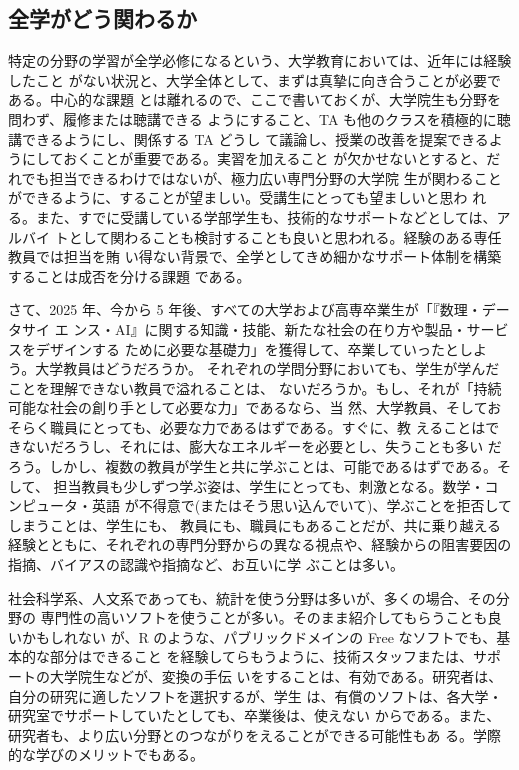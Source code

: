 \documentclass[
]{book}
\theoremstyle{definition}
\theoremstyle{definition}
\theoremstyle{definition}
\theoremstyle{definition}
\theoremstyle{remark}
\begin{document}
\hypertarget{ux5168ux5b66ux304cux3069ux3046ux95a2ux308fux308bux304b}{%
\subsection{全学がどう関わるか}\label{ux5168ux5b66ux304cux3069ux3046ux95a2ux308fux308bux304b}}

特定の分野の学習が全学必修になるという、大学教育においては、近年には経験したこと がない状況と、大学全体として、まずは真摯に向き合うことが必要である。中心的な課題 とは離れるので、ここで書いておくが、大学院生も分野を問わず、履修または聴講できる ようにすること、TA も他のクラスを積極的に聴講できるようにし、関係する TA どうし て議論し、授業の改善を提案できるようにしておくことが重要である。実習を加えること が欠かせないとすると、だれでも担当できるわけではないが、極力広い専門分野の大学院 生が関わることができるように、することが望ましい。受講生にとっても望ましいと思わ れる。また、すでに受講している学部学生も、技術的なサポートなどとしては、アルバイ トとして関わることも検討することも良いと思われる。経験のある専任教員では担当を賄 い得ない背景で、全学としてきめ細かなサポート体制を構築することは成否を分ける課題 である。

さて、2025 年、今から 5 年後、すべての大学および高専卒業生が「『数理・データサイ エ ンス・AI』に関する知識・技能、新たな社会の在り方や製品・サービスをデザインする ために必要な基礎力」を獲得して、卒業していったとしよう。大学教員はどうだろうか。 それぞれの学問分野においても、学生が学んだことを理解できない教員で溢れることは、 ないだろうか。もし、それが「持続可能な社会の創り手として必要な力」であるなら、当 然、大学教員、そしておそらく職員にとっても、必要な力であるはずである。すぐに、教 えることはできないだろうし、それには、膨大なエネルギーを必要とし、失うことも多い だろう。しかし、複数の教員が学生と共に学ぶことは、可能であるはずである。そして、 担当教員も少しずつ学ぶ姿は、学生にとっても、刺激となる。数学・コンピュータ・英語 が不得意で(またはそう思い込んでいて)、学ぶことを拒否してしまうことは、学生にも、 教員にも、職員にもあることだが、共に乗り越える経験とともに、それぞれの専門分野からの異なる視点や、経験からの阻害要因の指摘、バイアスの認識や指摘など、お互いに学 ぶことは多い。

社会科学系、人文系であっても、統計を使う分野は多いが、多くの場合、その分野の 専門性の高いソフトを使うことが多い。そのまま紹介してもらうことも良いかもしれない が、R のような、パブリックドメインの Free なソフトでも、基本的な部分はできること を経験してらもうように、技術スタッフまたは、サポートの大学院生などが、変換の手伝 いをすることは、有効である。研究者は、自分の研究に適したソフトを選択するが、学生 は、有償のソフトは、各大学・研究室でサポートしていたとしても、卒業後は、使えない からである。また、研究者も、より広い分野とのつながりをえることができる可能性もあ る。学際的な学びのメリットでもある。
\end{document}
